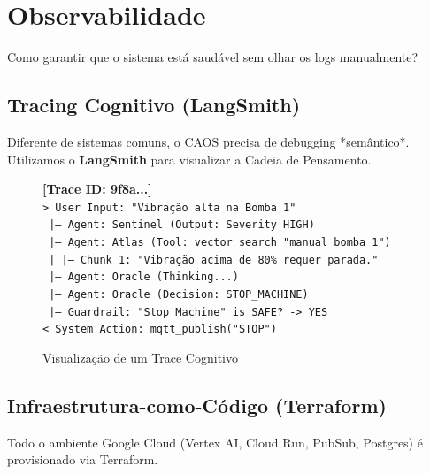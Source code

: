 \documentclass[12pt, a4paper]{article}
\begin{document}
\newpage

\section{Observabilidade}
\label{sec:ops}

Como garantir que o sistema está saudável sem olhar os logs manualmente?

\subsection{Tracing Cognitivo (LangSmith)}
Diferente de sistemas comuns, o CAOS precisa de debugging *semântico*. Utilizamos o \textbf{LangSmith} para visualizar a Cadeia de Pensamento.

\begin{figure}[h!]
    \centering
    \begin{tcolorbox}[title=Exemplo de Trace Log, colback=black!5!white]
    \small
    \textbf{[Trace ID: 9f8a...]} \\
    \texttt{> User Input: "Vibração alta na Bomba 1"} \\
    \texttt{  |-- Agent: Sentinel (Output: Severity HIGH)} \\
    \texttt{  |-- Agent: Atlas (Tool: vector\_search "manual bomba 1")} \\
    \texttt{  |   |-- Chunk 1: "Vibração acima de 80\% requer parada."} \\
    \texttt{  |-- Agent: Oracle (Thinking...)} \\
    \texttt{  |-- Agent: Oracle (Decision: STOP\_MACHINE)} \\
    \texttt{  |-- Guardrail: "Stop Machine" is SAFE? -> YES} \\
    \texttt{< System Action: mqtt\_publish("STOP")}
    \end{tcolorbox}
    \caption{Visualização de um Trace Cognitivo}
\end{figure}

\subsection{Infraestrutura-como-Código (Terraform)}
Todo o ambiente Google Cloud (Vertex AI, Cloud Run, PubSub, Postgres) é provisionado via Terraform.
\end{document}
